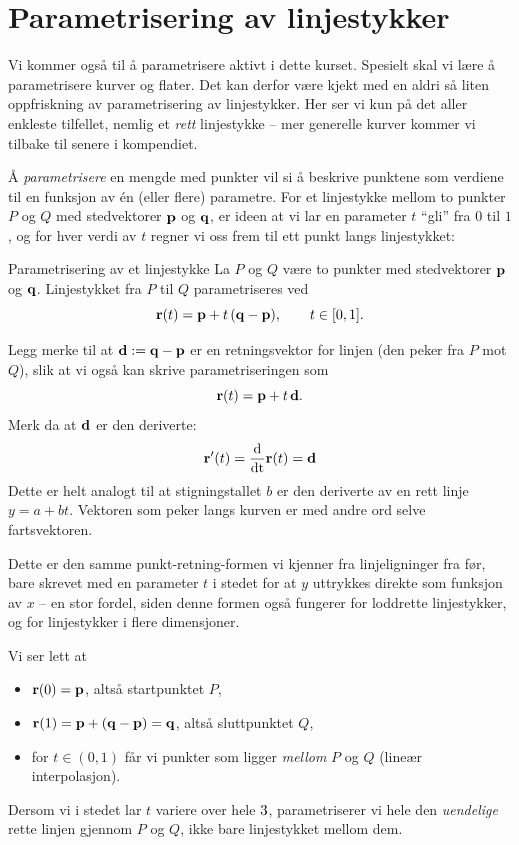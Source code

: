 \section{Parametrisering av linjestykker}
Vi kommer også til å parametrisere aktivt i dette kurset. Spesielt skal vi lære å parametrisere kurver og flater. Det kan derfor være kjekt med en aldri så liten oppfriskning av parametrisering av linjestykker. Her ser vi kun på det aller enkleste tilfellet, nemlig et \emph{rett} linjestykke -- mer generelle kurver kommer vi tilbake til senere i kompendiet.

Å \emph{parametrisere} en mengde med punkter vil si å beskrive punktene som verdiene til en funksjon av én (eller flere) parametre. For et linjestykke mellom to punkter $P$ og $Q$ med stedvektorer $\mathbf{p}$ og $\mathbf{q}$, er ideen at vi lar en parameter $t$ ``gli'' fra $0$ til $1$, og for hver verdi av $t$ regner vi oss frem til ett punkt langs linjestykket:

\begin{defn}{Parametrisering av et linjestykke}
La $P$ og $Q$ være to punkter med stedvektorer $\mathbf{p}$ og $\mathbf{q}$. Linjestykket fra $P$ til $Q$ parametriseres ved
\[
\mathbf{r}(t) = \mathbf{p} + t\,(\mathbf{q}-\mathbf{p}), \qquad t\in[0,1].
\]
\end{defn}

Legg merke til at $\mathbf{d}:=\mathbf{q}-\mathbf{p}$ er en retningsvektor for linjen (den peker fra $P$ mot $Q$), slik at vi også kan skrive parametriseringen som
\[
\mathbf{r}(t) = \mathbf{p} + t\,\mathbf{d}.
\]
Merk da at $\mathbf{d}$ er den deriverte: 
\[\mathbf{r}'(t)=\frac{\text{d}}{\text{dt}}\mathbf{r}(t)=\mathbf{d}\]
Dette er helt analogt til at stigningstallet $b$ er den deriverte av en rett linje $y=a+bt$. Vektoren som peker langs kurven er med andre ord selve fartsvektoren.

Dette er den samme punkt-retning-formen vi kjenner fra linjeligninger fra før, bare skrevet med en parameter $t$ i stedet for at $y$ uttrykkes direkte som funksjon av $x$ -- en stor fordel, siden denne formen også fungerer for loddrette linjestykker, og for linjestykker i flere dimensjoner.

Vi ser lett at
\begin{itemize}
\item $\mathbf{r}(0) = \mathbf{p}$, altså startpunktet $P$,
\item $\mathbf{r}(1) = \mathbf{p}+(\mathbf{q}-\mathbf{p}) = \mathbf{q}$, altså sluttpunktet $Q$,
\item for $t\in(0,1)$ får vi punkter som ligger \emph{mellom} $P$ og $Q$ (lineær interpolasjon).
\end{itemize}
Dersom vi i stedet lar $t$ variere over hele $3$, parametriserer vi hele den \emph{uendelige} rette linjen gjennom $P$ og $Q$, ikke bare linjestykket mellom dem.

